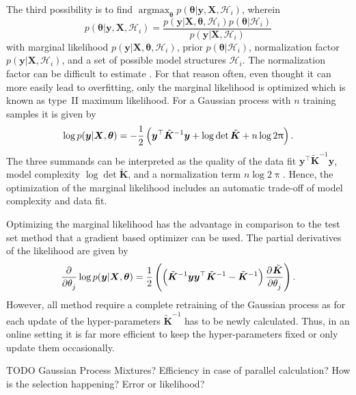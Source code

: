 \documentclass[11pt,a4paper,twoside,BCOR=15mm]{scrreprt}
\newcommand{\vc}[1]{\bm{#1}}
\newcommand{\mat}[1]{\bm{#1}}
\newcommand{\Tr}{^{\top}}
\DeclareMathOperator*{\argmax}{argmax}
\begin{document}
The third possibility is to find $\argmax_{\vc \theta} p(\vc\theta | \vc y, \mat 
X, \mathcal{H}_i)$, wherein
\begin{equation}
    p(\vc\theta | \vc y, \mat X, \mathcal{H}_i) = \frac{p(\vc y | \mat X, 
        \vc\theta, \mathcal{H}_i) p(\vc\theta | \mathcal{H}_i)}{p(\vc y | \mat 
        X, \mathcal{H}_i)}
\end{equation}
with marginal likelihood $p(\vc y | \mat X, \vc\theta, \mathcal{H}_i)$, prior 
$p(\vc\theta | \mathcal{H}_i)$, normalization factor $p(\vc y | \mat X, 
\mathcal{H}_i)$, and a set of possible model structures $\mathcal{H}_i$. The 
normalization factor can be difficult to estimate 
\parencite[109]{Rasmussen:2006vz}. For that reason often, even thought it can 
more easily lead to overfitting, only the marginal likelihood is optimized which 
is known as type~II maximum likelihood. For a Gaussian process with $n$ training 
samples it is given by
\begin{equation}
    \log p(\vc y | \mat X, \vc\theta) = -\frac{1}{2}\del{\vc y\Tr 
        \tilde{\mat{K}}^{-1} \vc y + \log \det \tilde{\mat K} + n \log 2\uppi} 
    \text{.}
\end{equation}
The three summands can be interpreted as the quality of the data fit $\vc y\Tr 
\tilde{\mat K}^{-1} \vc y$, model complexity $\log \det \tilde{\mat K}$, and 
a normalization term $n \log 2\uppi$. Hence, the optimization of the marginal 
likelihood includes an automatic trade-off of model complexity and data fit.

Optimizing the marginal likelihood has the advantage in comparison to the test 
set method that a gradient based optimizer can be used. The partial derivatives 
of the likelihood are given by
\begin{equation}
    \dpd{}{\theta_j} \log p(\vc y | \mat X, \vc\theta) = \frac{1}{2} 
    \del{\del{\tilde{\mat K}^{-1}\vc y \vc y\Tr \tilde{\mat K}^{-1} 
            - \tilde{\mat{K}}^{-1}} \dpd{\tilde{\mat K}}{\theta_j}} \text{.}
\end{equation}
However, all method require a complete retraining of the Gaussian process as for 
each update of the hyper-parameters $\tilde{\mat K}^{-1}$ has to be newly 
calculated. Thus, in an online setting it is far more efficient to keep the 
hyper-parameters fixed or only update them occasionally.

TODO Gaussian Process Mixtures? Efficiency in case of parallel calculation?
How is the selection happening? Error or likelihood?
\end{document}
